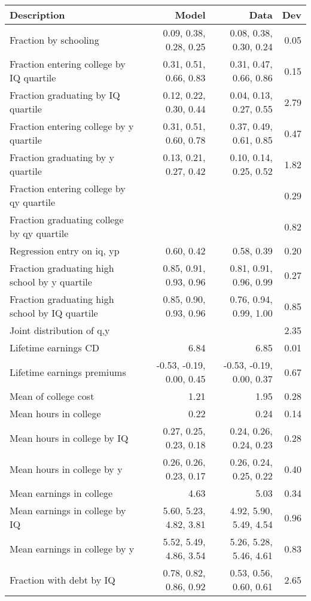 \begin{tabular}{lrrr}
\hline
Description & Model  & Data  & Dev  \\ 
\hline
Fraction by schooling & 0.09, 0.38, 0.28, 0.25  & 0.08, 0.38, 0.30, 0.24  & 0.05  \\ 
Fraction entering college by IQ quartile & 0.31, 0.51, 0.66, 0.83  & 0.31, 0.47, 0.66, 0.86  & 0.15  \\ 
Fraction graduating by IQ quartile & 0.12, 0.22, 0.30, 0.44  & 0.04, 0.13, 0.27, 0.55  & 2.79  \\ 
Fraction entering college by y quartile & 0.31, 0.51, 0.60, 0.78  & 0.37, 0.49, 0.61, 0.85  & 0.47  \\ 
Fraction graduating by y quartile & 0.13, 0.21, 0.27, 0.42  & 0.10, 0.14, 0.25, 0.52  & 1.82  \\ 
Fraction entering college by qy quartile &   &   & 0.29  \\ 
Fraction graduating college by qy quartile &   &   & 0.82  \\ 
Regression entry on iq, yp & 0.60, 0.42  & 0.58, 0.39  & 0.20  \\ 
Fraction graduating high school by y quartile & 0.85, 0.91, 0.93, 0.96  & 0.81, 0.91, 0.96, 0.99  & 0.27  \\ 
Fraction graduating high school by IQ quartile & 0.85, 0.90, 0.93, 0.96  & 0.76, 0.94, 0.99, 1.00  & 0.85  \\ 
Joint distribution of q,y &   &   & 2.35  \\ 
Lifetime earnings CD & 6.84  & 6.85  & 0.01  \\ 
Lifetime earnings premiums & -0.53, -0.19, 0.00, 0.45  & -0.53, -0.19, 0.00, 0.37  & 0.67  \\ 
Mean of college cost & 1.21  & 1.95  & 0.28  \\ 
Mean hours in college & 0.22  & 0.24  & 0.14  \\ 
Mean hours in college by IQ & 0.27, 0.25, 0.23, 0.18  & 0.24, 0.26, 0.24, 0.23  & 0.28  \\ 
Mean hours in college by y & 0.26, 0.26, 0.23, 0.17  & 0.26, 0.24, 0.25, 0.22  & 0.40  \\ 
Mean earnings in college & 4.63  & 5.03  & 0.34  \\ 
Mean earnings in college by IQ & 5.60, 5.23, 4.82, 3.81  & 4.92, 5.90, 5.49, 4.54  & 0.96  \\ 
Mean earnings in college by y & 5.52, 5.49, 4.86, 3.54  & 5.26, 5.28, 5.46, 4.61  & 0.83  \\ 
Fraction with debt by IQ & 0.78, 0.82, 0.86, 0.92  & 0.53, 0.56, 0.60, 0.61  & 2.65  \\ 

\end{tabular}
